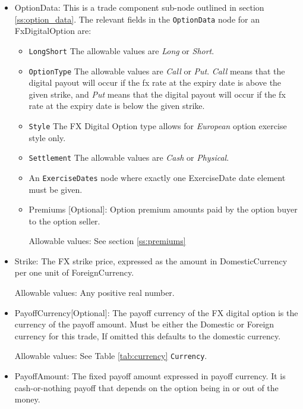 \begin{itemize}

\item OptionData: This is a trade component sub-node outlined in section \ref{ss:option_data}. 
The relevant fields in the \lstinline!OptionData! node for an FxDigitalOption are:

\begin{itemize}
\item \lstinline!LongShort! The allowable values are \emph{Long} or \emph{Short}.

\item \lstinline!OptionType! The allowable values are \emph{Call} or \emph{Put}. \emph{Call} means that the digital payout will occur if the fx rate at the expiry date is above the given strike, and \emph{Put} means that the digital payout will occur if the fx rate at the expiry date is below the given strike.

\item  \lstinline!Style! The FX Digital Option type allows for \emph{European} option exercise style only.

\item  \lstinline!Settlement! The allowable values are \emph{Cash} or \emph{Physical}.

\item An \lstinline!ExerciseDates! node where exactly one ExerciseDate date element must be given.

\item Premiums [Optional]: Option premium amounts paid by the option buyer to the option seller.

Allowable values:  See section \ref{ss:premiums}

\end{itemize}

\item Strike: The FX strike price, expressed as the amount in DomesticCurrency per one unit of ForeignCurrency. 

Allowable values:  Any positive real number.

\item PayoffCurrency[Optional]: The payoff currency of the FX digital option is the currency of the payoff amount. Must be either the Domestic or Foreign currency for this trade, If omitted this defaults to the domestic currency.

Allowable values:  See Table \ref{tab:currency} \lstinline!Currency!.

\item PayoffAmount: The fixed payoff amount expressed in payoff currency. It is cash-or-nothing payoff that depends on the option being in or out of the money.


\end{itemize}
